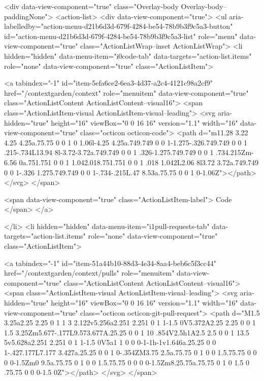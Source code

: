      <div data-view-component="true" class="Overlay-body Overlay-body--paddingNone">          <action-list>
  <div data-view-component="true">
    <ul aria-labelledby="action-menu-d21b6d3d-679f-4284-be54-78b9b3f9c5a3-button" id="action-menu-d21b6d3d-679f-4284-be54-78b9b3f9c5a3-list" role="menu" data-view-component="true" class="ActionListWrap--inset ActionListWrap">
        <li hidden="hidden" data-menu-item="i0code-tab" data-targets="action-list.items" role="none" data-view-component="true" class="ActionListItem">
    
    
    <a tabindex="-1" id="item-5efa6ce2-6ea3-4d37-a2c4-4121c98a2cf9" href="/contextgarden/context" role="menuitem" data-view-component="true" class="ActionListContent ActionListContent--visual16">
        <span class="ActionListItem-visual ActionListItem-visual--leading">
          <svg aria-hidden="true" height="16" viewBox="0 0 16 16" version="1.1" width="16" data-view-component="true" class="octicon octicon-code">
    <path d="m11.28 3.22 4.25 4.25a.75.75 0 0 1 0 1.06l-4.25 4.25a.749.749 0 0 1-1.275-.326.749.749 0 0 1 .215-.734L13.94 8l-3.72-3.72a.749.749 0 0 1 .326-1.275.749.749 0 0 1 .734.215Zm-6.56 0a.751.751 0 0 1 1.042.018.751.751 0 0 1 .018 1.042L2.06 8l3.72 3.72a.749.749 0 0 1-.326 1.275.749.749 0 0 1-.734-.215L.47 8.53a.75.75 0 0 1 0-1.06Z"></path>
</svg>
        </span>
      
        <span data-view-component="true" class="ActionListItem-label">
          Code
</span>      
</a>
  
</li>
        <li hidden="hidden" data-menu-item="i1pull-requests-tab" data-targets="action-list.items" role="none" data-view-component="true" class="ActionListItem">
    
    
    <a tabindex="-1" id="item-51a44b10-88d3-4e34-8aa4-beb6c5f3cc44" href="/contextgarden/context/pulls" role="menuitem" data-view-component="true" class="ActionListContent ActionListContent--visual16">
        <span class="ActionListItem-visual ActionListItem-visual--leading">
          <svg aria-hidden="true" height="16" viewBox="0 0 16 16" version="1.1" width="16" data-view-component="true" class="octicon octicon-git-pull-request">
    <path d="M1.5 3.25a2.25 2.25 0 1 1 3 2.122v5.256a2.251 2.251 0 1 1-1.5 0V5.372A2.25 2.25 0 0 1 1.5 3.25Zm5.677-.177L9.573.677A.25.25 0 0 1 10 .854V2.5h1A2.5 2.5 0 0 1 13.5 5v5.628a2.251 2.251 0 1 1-1.5 0V5a1 1 0 0 0-1-1h-1v1.646a.25.25 0 0 1-.427.177L7.177 3.427a.25.25 0 0 1 0-.354ZM3.75 2.5a.75.75 0 1 0 0 1.5.75.75 0 0 0 0-1.5Zm0 9.5a.75.75 0 1 0 0 1.5.75.75 0 0 0 0-1.5Zm8.25.75a.75.75 0 1 0 1.5 0 .75.75 0 0 0-1.5 0Z"></path>
</svg>
        </span>
      
